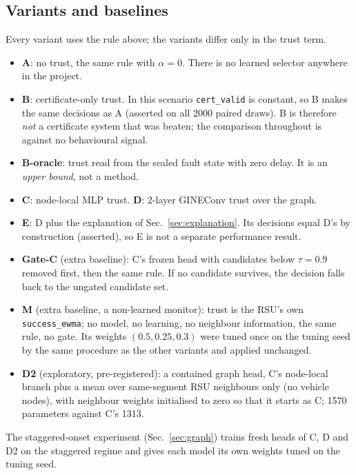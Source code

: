 \subsection{Variants and baselines}
\label{sec:variants}
Every variant uses the rule above; the variants differ only in the trust term.
\begin{itemize}
\item \textbf{A}: no trust, the same rule with $\alpha=0$. There is no learned selector anywhere in the project.
\item \textbf{B}: certificate-only trust. In this scenario \texttt{cert\_valid} is constant, so B makes the same decisions as A (asserted on all 2000 paired draws).
B is therefore \emph{not} a certificate system that was beaten; the comparison throughout is against no behavioural signal.
\item \textbf{B-oracle}: trust read from the sealed fault state with zero delay. It is an \emph{upper bound}, not a method.
\item \textbf{C}: node-local MLP trust. \textbf{D}: 2-layer GINEConv trust over the graph.
\item \textbf{E}: D plus the explanation of Sec.~\ref{sec:explanation}. Its decisions equal D's by construction (asserted), so E is not a separate performance result.
\item \textbf{Gate-C} (extra baseline): C's frozen head with candidates below $\tau=0.9$ removed first, then the same rule. If no candidate survives, the decision falls back to the ungated candidate set.
\item \textbf{M} (extra baseline, a non-learned monitor): trust is the RSU's own \texttt{success\_ewma}; no model, no learning, no neighbour information, the same rule, no gate. Its weights $(0.5,0.25,0.3)$ were tuned once on the tuning seed by the same procedure as the other variants and applied unchanged.
\item \textbf{D2} (exploratory, pre-registered): a contained graph head, C's node-local branch plus a mean over same-segment RSU neighbours only (no vehicle nodes), with neighbour weights initialised to zero so that it starts as C; 1570 parameters against C's 1313.
\end{itemize}
The staggered-onset experiment (Sec.~\ref{sec:graph}) trains fresh heads of C, D and D2 on the staggered regime and gives each model its own weights tuned on the tuning seed.
